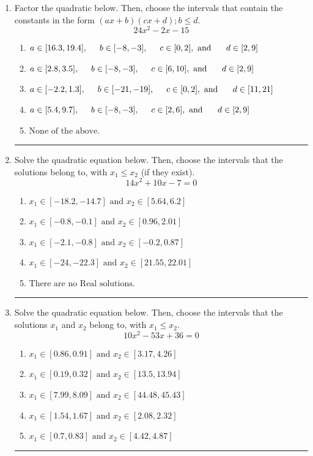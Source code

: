 \documentclass[14pt]{extbook}
\newcommand{\litem}[1]{\item#1\hspace*{-1cm}\rule{\textwidth}{0.4pt}}
\begin{document}
\begin{enumerate}
{\begin{enumerate}[label=\Alph*.]
\end{enumerate} }
\litem{
Factor the quadratic below. Then, choose the intervals that contain the constants in the form $(ax+b)(cx+d); b \leq d.$\[ 24x^{2} -2 x -15 \]\begin{enumerate}[label=\Alph*.]
\item \( a \in [16.3, 19.4], \hspace*{5mm} b \in [-8, -3], \hspace*{5mm} c \in [0, 2], \text{ and } \hspace*{5mm} d \in [2, 9] \)
\item \( a \in [2.8, 3.5], \hspace*{5mm} b \in [-8, -3], \hspace*{5mm} c \in [6, 10], \text{ and } \hspace*{5mm} d \in [2, 9] \)
\item \( a \in [-2.2, 1.3], \hspace*{5mm} b \in [-21, -19], \hspace*{5mm} c \in [0, 2], \text{ and } \hspace*{5mm} d \in [11, 21] \)
\item \( a \in [5.4, 9.7], \hspace*{5mm} b \in [-8, -3], \hspace*{5mm} c \in [2, 6], \text{ and } \hspace*{5mm} d \in [2, 9] \)
\item \( \text{None of the above.} \)

\end{enumerate} }
\litem{
Solve the quadratic equation below. Then, choose the intervals that the solutions belong to, with $x_1 \leq x_2$ (if they exist).\[ 14x^{2} +10 x -7 = 0 \]\begin{enumerate}[label=\Alph*.]
\item \( x_1 \in [-18.2, -14.7] \text{ and } x_2 \in [5.64, 6.2] \)
\item \( x_1 \in [-0.8, -0.1] \text{ and } x_2 \in [0.96, 2.01] \)
\item \( x_1 \in [-2.1, -0.8] \text{ and } x_2 \in [-0.2, 0.87] \)
\item \( x_1 \in [-24, -22.3] \text{ and } x_2 \in [21.55, 22.01] \)
\item \( \text{There are no Real solutions.} \)

\end{enumerate} }
\litem{
Solve the quadratic equation below. Then, choose the intervals that the solutions $x_1$ and $x_2$ belong to, with $x_1 \leq x_2$.\[ 10x^{2} -53 x + 36 = 0 \]\begin{enumerate}[label=\Alph*.]
\item \( x_1 \in [0.86, 0.91] \text{ and } x_2 \in [3.17, 4.26] \)
\item \( x_1 \in [0.19, 0.32] \text{ and } x_2 \in [13.5, 13.94] \)
\item \( x_1 \in [7.99, 8.09] \text{ and } x_2 \in [44.48, 45.43] \)
\item \( x_1 \in [1.54, 1.67] \text{ and } x_2 \in [2.08, 2.32] \)
\item \( x_1 \in [0.7, 0.83] \text{ and } x_2 \in [4.42, 4.87] \)


\end{enumerate}}
\end{enumerate}
\end{document}
